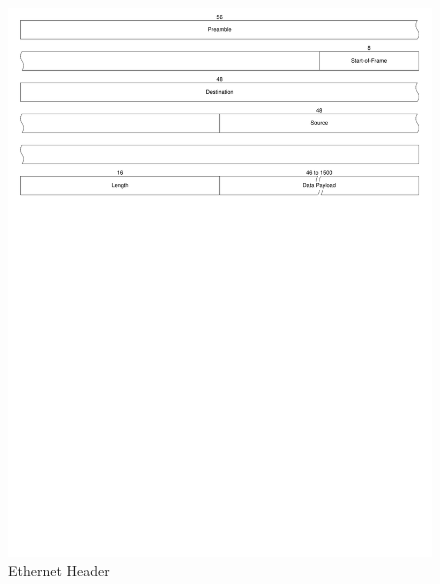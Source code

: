 \begin{landscape}
	\begin{figure}[p]
		\begin{centering}
			\includegraphics{Protocol/Figures/protocol-ethernet_header.pdf}
			\caption[Ethernet Header]{Ethernet Header \cite{ref:2004-forouzan-data_communications_and_networking}}
			\label{fig:protocol:ethernet_header}
		\end{centering}
	\end{figure}
\end{landscape}

